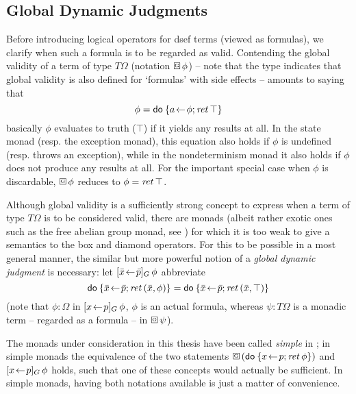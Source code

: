  

\subsection{Global Dynamic Judgments}
\label{sec:glob-dynam-judg}

Before introducing logical operators for dsef terms (viewed as formulas), we
clarify when such a formula is to be regarded as valid.  Contending the global
validity of a term of type $T\Omega$ (notation $\gbox \phi$) -- note that the type
indicates that global validity is also defined for `formulas' with side effects
-- amounts to saying that
\[
\phi = \mathsf{do}\: \{a\!\gets\!\phi; \mathit{ret\,} \top\}
\]
\IE basically $\phi$ evaluates to truth ($\top$) if it yields any results at all. In
the state monad (resp. the exception monad), this equation also holds if $\phi$
is undefined (resp. throws an exception), while in the nondeterminism
monad it also holds if $\phi$ does not produce any results at all. For the
important special case when $\phi$ is discardable, $\gbox \phi$ reduces to $\phi = \mathit{ret\,}
\top$.

Although global validity is a sufficiently strong concept to express when a term
of type $T\Omega$ is to be considered valid, there are monads (albeit rather exotic
ones such as the free abelian group monad, see \cite[Section
3]{SchroederMossakowski:PDL}) for which it is too weak to give a semantics to
the box and diamond operators. For this to be possible in a most general manner,
the similar but more powerful notion of a \emph{global dynamic judgment} is
necessary: let $[\bar x\!\gets\! \bar p]_G\,\phi$ abbreviate
\[ \mathsf{do}\: \{\bar x\!\gets\! \bar p; \mathit{ret\,} (\bar x, \phi)\} = \mathsf{do}\: \{\bar x\!\gets\! \bar p; \mathit{ret\,}(\bar
  x, \top)\} \]
(note that $\phi : \Omega$ in $[x\!\gets\! p]_G\,\phi$, \IE $\phi$ is an actual formula,
whereas $\psi : T \Omega$ is a monadic term -- regarded as a formula -- in $\gbox
\psi$). 
\begin{rem}
  The monads under consideration in this thesis have been called \emph{simple}
  in \cite{SchroederMossakowski:PDL}; in simple monads the equivalence of the
  two statements $\gbox (\DoStmt{x\leteq p; \ret \phi})$ and $[x\!\gets\! p]_G\,\phi$
  holds, such that one of these concepts would actually be sufficient. In simple
  monads, having both notations available is just a matter of convenience.
\end{rem}

